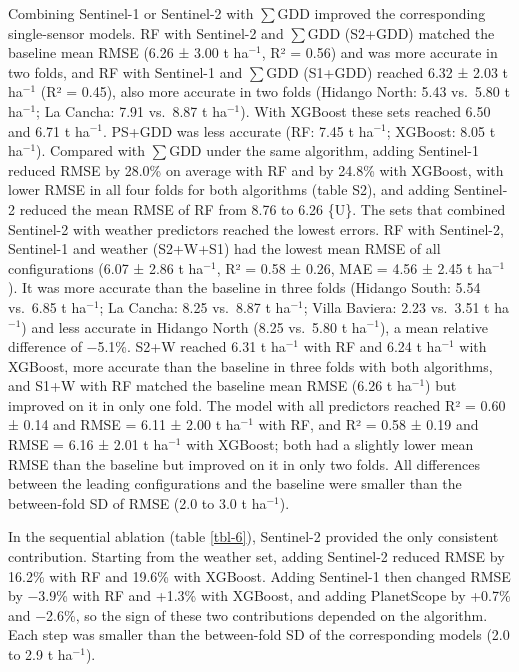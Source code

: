 \documentclass[
  british,
]{interact}
\begin{document}
Combining Sentinel-1 or Sentinel-2 with \(\sum\)GDD improved the
corresponding single-sensor models. RF with Sentinel-2 and \(\sum\)GDD
(S2+GDD) matched the baseline mean RMSE (6.26 ± 3.00 t ha\(^{-1}\), R² =
0.56) and was more accurate in two folds, and RF with Sentinel-1 and
\(\sum\)GDD (S1+GDD) reached 6.32 ± 2.03 t ha\(^{-1}\) (R² = 0.45), also
more accurate in two folds (Hidango North: 5.43 vs.~5.80 t ha\(^{-1}\);
La Cancha: 7.91 vs.~8.87 t ha\(^{-1}\)). With XGBoost these sets reached
6.50 and 6.71 t ha\(^{-1}\). PS+GDD was less accurate (RF: 7.45 t
ha\(^{-1}\); XGBoost: 8.05 t ha\(^{-1}\)). Compared with \(\sum\)GDD
under the same algorithm, adding Sentinel-1 reduced RMSE by 28.0\% on
average with RF and by 24.8\% with XGBoost, with lower RMSE in all four
folds for both algorithms (table S2), and adding Sentinel-2 reduced the
mean RMSE of RF from 8.76 to 6.26 \{U\}. The sets that combined
Sentinel-2 with weather predictors reached the lowest errors. RF with
Sentinel-2, Sentinel-1 and weather (S2+W+S1) had the lowest mean RMSE of
all configurations (6.07 ± 2.86 t ha\(^{-1}\), R² = 0.58 ± 0.26, MAE =
4.56 ± 2.45 t ha\(^{-1}\)). It was more accurate than the baseline in
three folds (Hidango South: 5.54 vs.~6.85 t ha\(^{-1}\); La Cancha: 8.25
vs.~8.87 t ha\(^{-1}\); Villa Baviera: 2.23 vs.~3.51 t ha\(^{-1}\)) and
less accurate in Hidango North (8.25 vs.~5.80 t ha\(^{-1}\)), a mean
relative difference of −5.1\%. S2+W reached 6.31 t ha\(^{-1}\) with RF
and 6.24 t ha\(^{-1}\) with XGBoost, more accurate than the baseline in
three folds with both algorithms, and S1+W with RF matched the baseline
mean RMSE (6.26 t ha\(^{-1}\)) but improved on it in only one fold. The
model with all predictors reached R² = 0.60 ± 0.14 and RMSE = 6.11 ±
2.00 t ha\(^{-1}\) with RF, and R² = 0.58 ± 0.19 and RMSE = 6.16 ± 2.01
t ha\(^{-1}\) with XGBoost; both had a slightly lower mean RMSE than the
baseline but improved on it in only two folds. All differences between
the leading configurations and the baseline were smaller than the
between-fold SD of RMSE (2.0 to 3.0 t ha\(^{-1}\)).

In the sequential ablation (table \ref{tbl-6}), Sentinel-2 provided the
only consistent contribution. Starting from the weather set, adding
Sentinel-2 reduced RMSE by 16.2\% with RF and 19.6\% with XGBoost.
Adding Sentinel-1 then changed RMSE by −3.9\% with RF and +1.3\% with
XGBoost, and adding PlanetScope by +0.7\% and −2.6\%, so the sign of
these two contributions depended on the algorithm. Each step was smaller
than the between-fold SD of the corresponding models (2.0 to 2.9 t
ha\(^{-1}\)).
\end{document}
